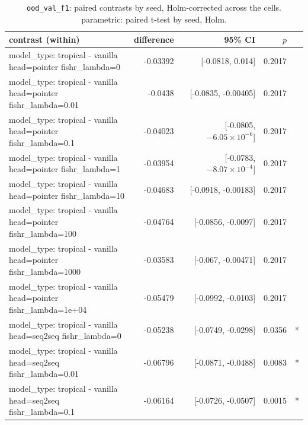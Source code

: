 \documentclass[10pt]{article}
\makeatletter
\newcommand{\stackcell}[1]{\begin{tabular}[t]{@{}l@{}}#1\end{tabular}}
\makeatother
\begin{document}
{\small
\begin{longtable}{lrrrl}
\caption{\texttt{ood\_val\_f1}: paired contrasts by seed, Holm-corrected across the cells. parametric: paired t-test by seed, Holm.}\label{tab:paired-ood_val_f1}\\
\toprule
contrast (within) & difference & 95\% CI & $p$ & \\
\midrule
\endhead
\stackcell{model\_type: tropical - vanilla\\\footnotesize head=pointer fishr\_lambda=0 } & -0.03392 & [-0.0818, 0.014] & 0.2017 & \\
\stackcell{model\_type: tropical - vanilla\\\footnotesize head=pointer fishr\_lambda=0.01 } & -0.0438 & [-0.0835, -0.00405] & 0.2017 & \\
\stackcell{model\_type: tropical - vanilla\\\footnotesize head=pointer fishr\_lambda=0.1 } & -0.04023 & [-0.0805, $-6.05\times10^{-6}$] & 0.2017 & \\
\stackcell{model\_type: tropical - vanilla\\\footnotesize head=pointer fishr\_lambda=1 } & -0.03954 & [-0.0783, $-8.07\times10^{-4}$] & 0.2017 & \\
\stackcell{model\_type: tropical - vanilla\\\footnotesize head=pointer fishr\_lambda=10 } & -0.04683 & [-0.0918, -0.00183] & 0.2017 & \\
\stackcell{model\_type: tropical - vanilla\\\footnotesize head=pointer fishr\_lambda=100 } & -0.04764 & [-0.0856, -0.0097] & 0.2017 & \\
\stackcell{model\_type: tropical - vanilla\\\footnotesize head=pointer fishr\_lambda=1000 } & -0.03583 & [-0.067, -0.00471] & 0.2017 & \\
\stackcell{model\_type: tropical - vanilla\\\footnotesize head=pointer fishr\_lambda=1e+04 } & -0.05479 & [-0.0992, -0.0103] & 0.2017 & \\
\stackcell{model\_type: tropical - vanilla\\\footnotesize head=seq2seq fishr\_lambda=0 } & -0.05238 & [-0.0749, -0.0298] & 0.0356 & *\\
\stackcell{model\_type: tropical - vanilla\\\footnotesize head=seq2seq fishr\_lambda=0.01 } & -0.06796 & [-0.0871, -0.0488] & 0.0083 & *\\
\stackcell{model\_type: tropical - vanilla\\\footnotesize head=seq2seq fishr\_lambda=0.1 } & -0.06164 & [-0.0726, -0.0507] & 0.0015 & *\\

\end{longtable}}
\end{document}
